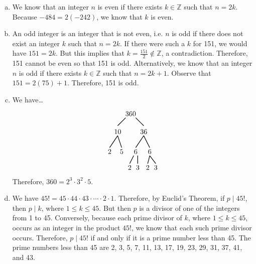 \documentclass[11pt,letterpaper]{article}
\begin{document}
\sol 
\begin{enumerate}[(a)]
\item We know that an integer $n$ is even if there exists $k \in \mathbb{Z}$ such that $n= 2k$. Because $-484= 2(-242)$, we know that $k$ is even. \pspace

\item An odd integer is an integer that is not even, i.e. $n$ is odd if there does not exist an integer $k$ such that $n= 2k$. If there were such a $k$ for 151, we would have $151= 2k$. But this implies that $k= \frac{151}{2} \notin \mathbb{Z}$, a contradiction. Therefore, 151 cannot be even so that 151 is odd. Alternatively, we know that an integer $n$ is odd if there exists $k \in \mathbb{Z}$ such that $n= 2k + 1$. Observe that $151= 2(75) + 1$. Therefore, 151 is odd. \pspace

\item We have\dots
	\[
	\begin{tikzpicture}
	\node at (-0.15,0.1) {$360$};
	\draw[line width=0.03cm] (-0.4,-0.1) -- (-0.8,-0.5);
	\node at (-0.8,-0.8) {$10$};
	\draw[line width=0.03cm]  (0.1,-0.1) -- (0.5,-0.5);
	\node at (0.5,-0.8) {$36$};
		
	\draw[line width=0.03cm] (-0.8,-1) -- (-1.2,-1.6);
	\node at (-1.2,-1.8) {$2$};
	\draw[line width=0.03cm] (-0.8,-1) -- (-0.6,-1.6);
	\node at (-0.6,-1.8) {$5$};
	
	\draw[line width=0.03cm] (0.5,-1) -- (0.1,-1.6);
	\node at (0.1,-1.8) {$6$};
	\draw[line width=0.03cm] (0.5,-1) -- (0.8,-1.6);
	\node at (0.8,-1.8) {$6$};
	
	\draw[line width=0.03cm] (0,-2.0) -- (-0.2,-2.4);
	\node at (-0.2,-2.6) {$2$};
	\draw[line width=0.03cm] (0.2,-2.0) -- (0.20,-2.4);
	\node at (0.20,-2.6) {$3$};
	
	\draw[line width=0.03cm] (0.8,-2.0) -- (0.7,-2.4);
	\node at (0.7,-2.6) {$2$};
	\draw[line width=0.03cm] (0.8,-2.0) -- (1.1,-2.4);
	\node at (1.1,-2.6) {$3$};
	\end{tikzpicture}
	\] 
Therefore, $360= 2^3 \cdot 3^2 \cdot 5$. \pspace

\item We have $45!= 45 \cdot 44 \cdot 43 \cdot \cdots \cdot 2 \cdot 1$. Therefore, by Euclid's Theorem, if $p \mid 45!$, then $p \mid k$, where $1 \leq k \leq 45$. But then $p$ is a divisor of one of the integers from 1 to 45. Conversely, because each prime divisor of $k$, where $1 \leq k \leq 45$, occurs as an integer in the product $45!$, we know that each such prime divisor occurs. Therefore, $p \mid 45!$ if and only if it is a prime number less than 45. The prime numbers less than 45 are 2, 3, 5, 7, 11, 13, 17, 19, 23, 29, 31, 37, 41, and 43. 


\end{enumerate}
\end{document}
